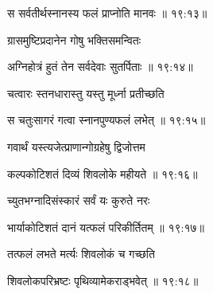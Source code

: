 
{\devanagarifont स सर्वतीर्थस्नानस्य फलं प्राप्नोति मानवः {॥ १९:१३॥} \veg\dontdisplaylinenum }%

{\devanagarifont ग्रासमुष्टिप्रदानेन गोषु भक्तिसमन्वितः \thinspace{\dandab} \dontdisplaylinenum }%


{\devanagarifont अग्निहोत्रं हुतं तेन सर्वदेवाः सुतर्पिताः {॥ १९:१४॥} \veg\dontdisplaylinenum }%

{\devanagarifont चत्वारः स्तनधारास्तु यस्तु मूर्ध्ना प्रतीच्छति \thinspace{\dandab} \dontdisplaylinenum }%


{\devanagarifont स चतुःसागरं गत्वा स्नानपुण्यफलं लभेत् {॥ १९:१५॥} \veg\dontdisplaylinenum }%
 
{\devanagarifont गवार्थं यस्त्यजेत्प्राणान्गोग्रहेषु द्विजोत्तम \thinspace{\dandab} \dontdisplaylinenum }%
 

{\devanagarifont कल्पकोटिशतं दिव्यं शिवलोके महीयते {॥ १९:१६॥} \veg\dontdisplaylinenum }%
 
{\devanagarifont च्युतभग्नादिसंस्कारं सर्वं यः कुरुते नरः \thinspace{\dandab} \dontdisplaylinenum }%
 

{\devanagarifont भार्याकोटिशतं दानं यत्फलं परिकीर्तितम् {॥ १९:१७॥} \veg\dontdisplaylinenum  }%

{\devanagarifont तत्फलं लभते मर्त्यः शिवलोकं च गच्छति \thinspace{\dandab} \dontdisplaylinenum }%


{\devanagarifont शिवलोकपरिभ्रष्टः पृथिव्यामेकराड्भवेत् {॥ १९:१८॥} \veg\dontdisplaylinenum }%
 
